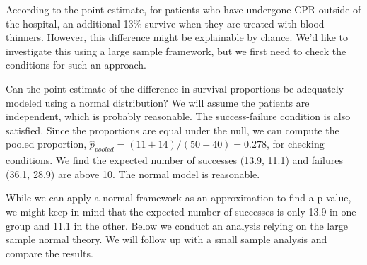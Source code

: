 According to the point estimate, for patients who have undergone CPR outside of the hospital, an additional 13\% survive when they are treated with blood thinners. However, this difference might be explainable by chance. We'd like to investigate this using a large sample framework, but we first need to check the conditions for such an approach.

\begin{example}{Can the point estimate of the difference in survival proportions be adequately modeled using a normal distribution?}
We will assume the patients are independent, which is probably reasonable. The success-failure condition is also satisfied. Since the proportions are equal under the null, we can compute the pooled proportion, $\hat{p}_{\textit{pooled}} = (11+14)/(50+40) = 0.278$, for checking conditions. We find the expected number of successes (13.9, 11.1) and failures (36.1, 28.9) are above 10. The normal model is reasonable.
\end{example}

While we can apply a normal framework as an approximation to find a p-value, we might keep in mind that the expected number of successes is only 13.9 in one group and 11.1 in the other. Below we conduct an analysis relying on the large sample normal theory. We will follow up with a small sample analysis and compare the results.

